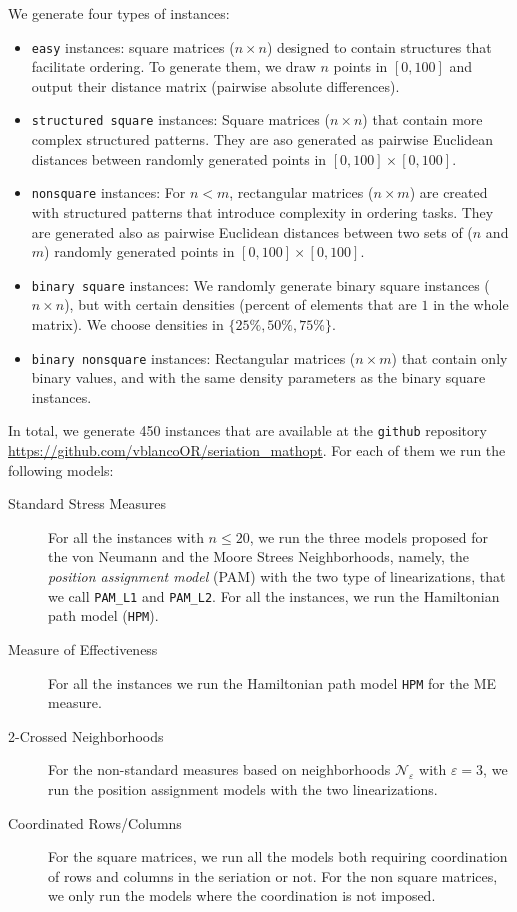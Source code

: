 \documentclass[a4paper,11pt, reqno]{amsart}
\begin{document}
We generate four types of instances:
\begin{itemize}
    \item \texttt{easy} instances: square matrices ($n \times n$) designed to contain structures that facilitate ordering. To generate them, we draw $n$ points in $[0,100]$ and output their distance matrix (pairwise absolute differences).
    \item \texttt{structured square} instances: Square matrices ($n\times n$) that contain more complex structured patterns. They are aso generated as pairwise Euclidean distances between randomly generated points in $[0,100]\times [0,100]$.
	\item \texttt{nonsquare} instances: For $n < m$, rectangular matrices ($n \times m$) are created with structured patterns that introduce complexity in ordering tasks. They are generated also as pairwise Euclidean distances between two sets of ($n$ and $m$) randomly generated points in $[0,100]\times [0,100]$.
    \item \texttt{binary square} instances: We randomly generate binary square instances ($n\times n$), but with certain densities (percent of elements that are $1$ in the whole matrix). We choose densities in $\{25\%,50\%,75\%\}$.
	\item \texttt{binary nonsquare} instances: Rectangular matrices ($n \times m$) that contain only binary values, and with the same density parameters as the binary square instances.
\end{itemize}
In total, we generate 450 instances that are available at the \texttt{github} repository \url{https://github.com/vblancoOR/seriation_mathopt}. For each of them we run the following models:
\begin{description}
    \item[Standard Stress Measures] For all the instances with $n\leq 20$, we run the three models proposed for the von Neumann and the Moore Strees Neighborhoods, namely, the \emph{position assignment model} (PAM) with the two type of linearizations, that we call \texttt{PAM\_L1} and \texttt{PAM\_L2}. For all the instances, we run the Hamiltonian path model (\texttt{HPM}).
    \item[Measure of Effectiveness] For all the instances we run the Hamiltonian path model \texttt{HPM} for the ME measure.
    \item[2-Crossed Neighborhoods] For the non-standard measures based on neighborhoods $\mathcal{N}_\varepsilon$ with $\varepsilon=3$, we run the position assignment models with the two linearizations.
    \item[Coordinated Rows/Columns] For the square matrices, we run all the models both requiring coordination of rows and columns in the seriation or not. For the non square matrices, we only run the models where the coordination is not imposed.
\end{description}
\end{document}
